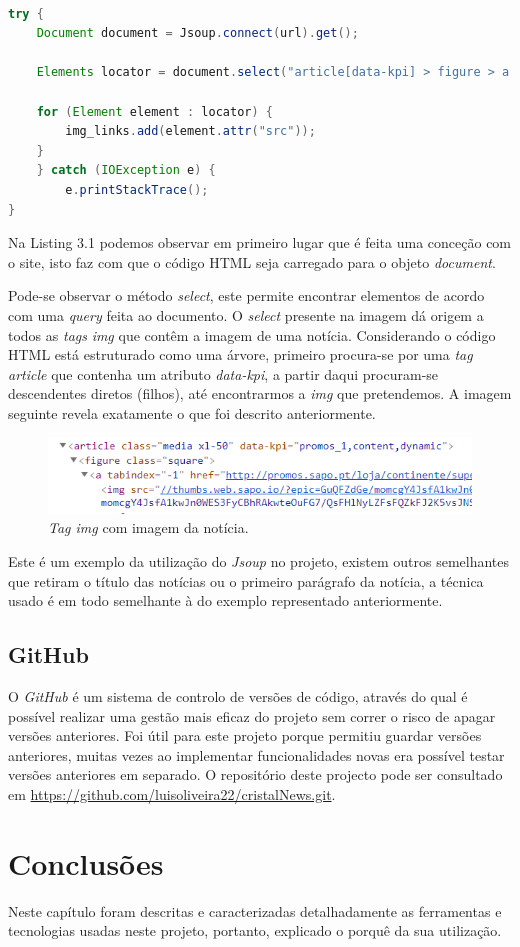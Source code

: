 \begin{lstlisting}[language=Java, caption = Selecionar imagens de \emph{website} \label{code:imagens}]

try {
    Document document = Jsoup.connect(url).get();
    
    Elements locator = document.select("article[data-kpi] > figure > a > img");
            
    for (Element element : locator) {
        img_links.add(element.attr("src")); 
    }
    } catch (IOException e) {
        e.printStackTrace();
}
\end{lstlisting}
Na Listing 3.1 podemos observar em primeiro lugar que é feita uma conceção com o site, isto faz com que o código \ac{HTML} seja carregado para o objeto \emph{document}. \par
Pode-se observar o método \emph{select}, este permite encontrar elementos de acordo com uma \emph{query} feita ao documento.  O \emph{select} presente na imagem dá origem a todos as \emph{tags} \emph{img} que contêm a imagem de uma notícia. Considerando o código \ac{HTML} está estruturado como uma árvore, primeiro procura-se por uma \emph{tag} \emph{article} que contenha um atributo \emph{data-kpi}, a partir daqui procuram-se descendentes diretos (filhos), até encontrarmos a \emph{img} que pretendemos.
 A imagem seguinte revela exatamente o que foi descrito anteriormente.
\vspace{0,07cm}
\begin{figure}[H]
\centering
\includegraphics[scale=0.7]{imagens/html_img.PNG}
\caption{\emph{Tag img} com imagem da notícia.}
\label{fig:gestao}
\end{figure}



Este é um exemplo da utilização do \emph{Jsoup} no projeto, existem outros semelhantes que retiram o título das notícias ou o primeiro parágrafo da notícia, a técnica usado é em todo semelhante à do exemplo representado anteriormente.

\subsection{GitHub}
O \emph{GitHub} é um sistema de controlo de versões de código, através do qual  é possível realizar uma gestão mais eficaz do projeto sem correr o risco de apagar versões anteriores. Foi útil para este projeto porque permitiu guardar versões anteriores, muitas vezes ao implementar funcionalidades novas era possível testar versões anteriores em separado.
O repositório deste projecto pode ser consultado em \url{https://github.com/luisoliveira22/cristalNews.git}.


  

\section{Conclusões}
\label{chap3:sec:concs}
Neste capítulo foram descritas e caracterizadas detalhadamente as ferramentas e tecnologias usadas neste projeto, portanto, explicado o porquê da sua utilização.